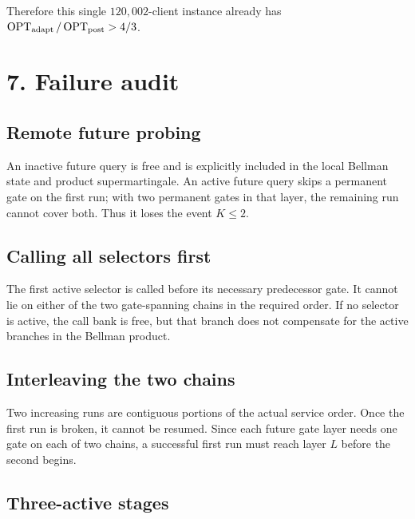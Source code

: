 \documentclass[11pt,a4paper]{article}
\begin{document}
Therefore this single \(120{,}002\)-client instance already has \(\operatorname{OPT}_{\rm adapt}/\operatorname{OPT}_{\rm post}>4/3\).


\section*{7. Failure audit}

\subsection*{Remote future probing}

An inactive future query is free and is explicitly included in the local Bellman state and product supermartingale.  An active future query skips a permanent gate on the first run; with two permanent gates in that layer, the remaining run cannot cover both.  Thus it loses the event \(K\le2\).


\subsection*{Calling all selectors first}

The first active selector is called before its necessary predecessor gate. It cannot lie on either of the two gate-spanning chains in the required order.  If no selector is active, the call bank is free, but that branch does not compensate for the active branches in the Bellman product.


\subsection*{Interleaving the two chains}

Two increasing runs are contiguous portions of the actual service order. Once the first run is broken, it cannot be resumed.  Since each future gate layer needs one gate on each of two chains, a successful first run must reach layer \(L\) before the second begins.


\subsection*{Three-active stages}
\end{document}
